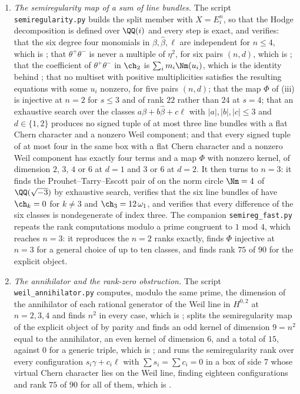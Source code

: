 \begin{enumerate}[label=\textup{(\Roman*)},leftmargin=*]
\item \emph{The semiregularity map of a sum of line bundles.} The script
  \texttt{semiregularity.py} builds the split member with $X=E_{i}^{n}$, so
  that the Hodge decomposition is defined over $\QQ(i)$ and every step is
  exact, and verifies: that the six degree four monomials in
  $\beta,\widehat\beta,\ell$ are independent for $n\le4$, which is
  ; that $\theta^{+}\theta^{-}$ is never a multiple
  of $\eta^{2}$, for six pairs $(n,d)$, which is ; that the coefficient of $\theta^{+}\theta^{-}$
  in $\ch_{2}$ is $\sum_{i}m_{i}\Nm(u_{i})$, which is the identity behind
  ; that no multiset with positive multiplicities
  satisfies the resulting equations with some $u_{i}$ nonzero, for five pairs
  $(n,d)$; that the map $\Phi$ of (iii) is injective
  at $n=2$ for $s\le3$ and of rank $22$ rather than $24$ at $s=4$; that
  an exhaustive search over the classes $a\beta+b\widehat\beta+c\ell$ with
  $|a|,|b|,|c|\le3$ and $d\in\{1,2\}$ produces no signed tuple of at most
  three line bundles with a flat Chern character and a nonzero Weil component;
  and that every signed tuple of at most four in the same box with a flat
  Chern character and a nonzero Weil component has exactly four terms and a
  map $\Phi$ with nonzero kernel, of dimension $2$, $3$, $4$ or $6$ at $d=1$
  and $3$ or $6$ at $d=2$. It then turns
  to $n=3$: it finds the Prouhet--Tarry--Escott pair of  on the
  norm circle $\Nm=4$ of $\QQ(\sqrt{-3})$ by exhaustive search, verifies that
  the six line bundles of  have
  $\ch_{k}=0$ for $k\ne3$ and $\ch_{3}=12\,\omega_{1}$, and verifies that
  every difference of the six classes is nondegenerate of index three. The
  companion \texttt{semireg\_fast.py} repeats the rank computations modulo a
  prime congruent to $1$ mod $4$, which reaches $n=3$: it reproduces the $n=2$
  ranks exactly, finds $\Phi$ injective at $n=3$ for a general choice of up to
  ten classes, and finds rank $75$ of $90$ for the explicit object.

\item \emph{The annihilator and the rank-zero obstruction.} The script
  \texttt{weil\_annihilator.py} computes, modulo the same prime, the
  dimension of the annihilator of each rational generator of the Weil line
  in $H^{0,2}$ at $n=2,3,4$ and finds $n^{2}$ in every case, which is
  ; splits the semiregularity map of the explicit
  object of  by parity and finds an odd kernel of
  dimension $9=n^{2}$ equal to the annihilator, an even kernel of dimension
  $6$, and a total of $15$, against $0$ for a generic triple, which is
  ; and runs the semiregularity rank over every
  configuration $s_{i}\gamma+c_{i}\ell$ with $\sum s_{i}=\sum c_{i}=0$ in a
  box of side $7$ whose virtual Chern character lies on the Weil line,
  finding eighteen configurations and rank $75$ of $90$ for all of them,
  which is .


\end{enumerate}

